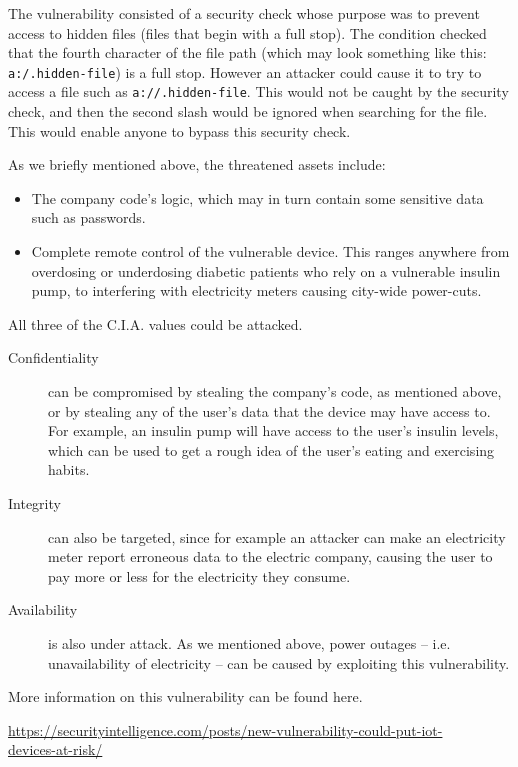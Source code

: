 \documentclass{article}
\begin{document}
The vulnerability consisted of a security check whose purpose was to prevent access to hidden files (files that begin with a full stop). The condition checked that the fourth character of the file path (which may look something like this: \verb|a:/.hidden-file|) is a full stop. However an attacker could cause it to try to access a file such as \verb|a://.hidden-file|. This would not be caught by the security check, and then the second slash would be ignored when searching for the file. This would enable anyone to bypass this security check.

As we briefly mentioned above, the threatened assets include:
\begin{itemize}
	\item The company code's logic, which may in turn contain some sensitive data such as passwords.
	\item Complete remote control of the vulnerable device. This ranges anywhere from overdosing or underdosing diabetic patients who rely on a vulnerable insulin pump, to interfering with electricity meters causing city-wide power-cuts.
\end{itemize}

All three of the C.I.A. values could be attacked.
\begin{description}
	\item[Confidentiality] can be compromised by stealing the company's code, as mentioned above, or by stealing any of the user's data that the device may have access to. For example, an insulin pump will have access to the user's insulin levels, which can be used to get a rough idea of the user's eating and exercising habits.
	\item[Integrity] can also be targeted, since for example an attacker can make an electricity meter report erroneous data to the electric company, causing the user to pay more or less for the electricity they consume.
	\item[Availability] is also under attack. As we mentioned above, power outages -- i.e. unavailability of electricity -- can be caused by exploiting this vulnerability.
\end{description}

More information on this vulnerability can be found here.

\href{https://securityintelligence.com/posts/new-vulnerability-could-put-iot-devices-at-risk/}{https://securityintelligence.com/posts/new-vulnerability-could-put-iot-}\\\href{https://securityintelligence.com/posts/new-vulnerability-could-put-iot-devices-at-risk/}{devices-at-risk/}
\end{document}
